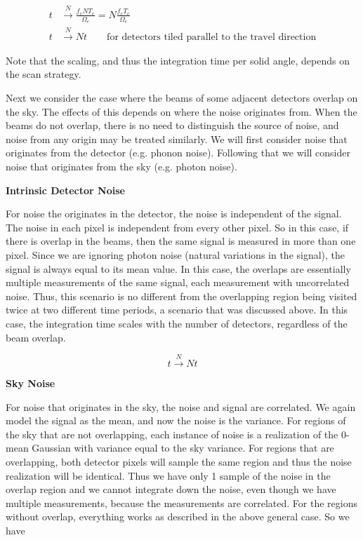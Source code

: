 \documentclass[twoside,10pt]{article}
\begin{document}
\begin{align*}
    t & \xrightarrow{N} \frac{f_e N T_e}{\Omega_e} = N \frac{f_e T_e}{\Omega_e} \\
    t & \xrightarrow{N} N t \qquad \text{for detectors tiled parallel to the travel direction}
\end{align*}

Note that the scaling, and thus the integration time per solid angle, depends
on the scan strategy.

Next we consider the case where the beams of some adjacent detectors overlap
on the sky. The effects of this depends on where the noise originates from.
When the beams do not overlap, there is no need to distinguish the source of
noise, and noise from any origin may be treated similarly. We will first
consider noise that originates from the detector (e.g. phonon noise).
Following that we will consider noise that originates from the sky (e.g.
photon noise).

\textbf{Intrinsic Detector Noise}

For noise the originates in the detector, the noise is independent of the
signal. The noise in each pixel is independent from every other pixel. So in
this case, if there is overlap in the beams, then the same signal is measured
in more than one pixel. Since we are ignoring photon noise (natural variations
in the signal), the signal is always equal to its mean value. In this case,
the overlaps are essentially multiple measurements of the same signal, each
measurement with uncorrelated noise. Thus, this scenario is no different from
the overlapping region being visited twice at two different time periods, a
scenario that was discussed above. In this case, the integration time scales
with the number of detectors, regardless of the beam overlap.

\begin{equation*}
    t \xrightarrow{N} N t
\end{equation*}

\textbf{Sky Noise}

For noise that originates in the sky, the noise and signal are correlated. We
again model the signal as the mean, and now the noise is the variance. For
regions of the sky that are not overlapping, each instance of noise is a
realization of the 0-mean Gaussian with variance equal to the sky variance.
For regions that are overlapping, both detector pixels will sample the same
region and thus the noise realization will be identical. Thus we have only 1
sample of the noise in the overlap region and we cannot integrate down the
noise, even though we have multiple measurements, because the measurements are
correlated. For the regions without overlap, everything works as described in
the above general case. So we have
\end{document}
